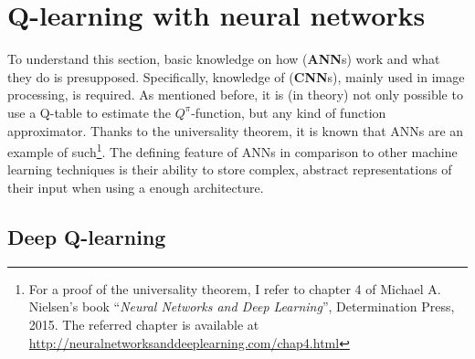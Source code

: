 %


\section{Q-learning with neural networks}

To understand this section, basic knowledge on how  (\textbf{ANN}s) work and what they do is presupposed. Specifically, knowledge of  (\textbf{CNN}s)\cite{yann_lecun_gradient-based_1998}, mainly used in image processing, is required. As mentioned before, it is (in theory) not only possible to use a Q-table to estimate the $Q^\pi$-function, but any kind of function approximator. Thanks to the universality theorem, it is known that ANNs are an example of such\footnote{For a proof of the universality theorem, I refer to chapter 4 of Michael A. Nielsen's book ``\textit{Neural Networks and Deep Learning}'', Determination Press, 2015. The referred chapter is available at \url{http://neuralnetworksanddeeplearning.com/chap4.html}}. The defining feature of ANNs in comparison to other machine learning techniques is their ability to store complex, abstract representations of their input when using a  enough architecture.

\subsection{Deep Q-learning} \label{ch:DQN}

